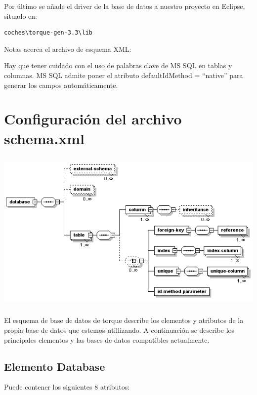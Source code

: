 \documentclass[12pt, oneside]{article}
\begin{document}
Por último se añade el driver de la base de datos a nuestro proyecto en Eclipse, situado en:
\begin{lstlisting}
coches\torque-gen-3.3\lib
\end{lstlisting}


Notas acerca el archivo de esquema XML:

Hay que tener cuidado con el uso de palabras clave de MS SQL en tablas y columnas. 
MS SQL admite poner el atributo defaultIdMethod = “native” para generar los campos automáticamente.

\section{Configuración del archivo schema.xml}
\begin{center}
	\includegraphics[height=8cm]{img/xml-config.png}
\end{center}
	
	El esquema de base de datos de torque describe los elementos y atributos de la propia base de datos que estemos utillizando. A continuación se describe los principales elementos y las bases de datos compatibles actualmente.

\subsection{Elemento Database}
Puede contener los siguientes 8 atributos:
\end{document}
